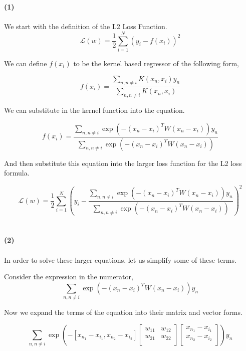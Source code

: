 \documentclass[submit]{harvardml}
\begin{document}
\begin{tcolorbox}[breakable]

\textbf{(1)}\\\\

We start with the definition of the L2 Loss Function.
$$\mathcal{L}(w) = \dfrac{1}{2}\sum\limits_{i = 1}^N (y_i - f(x_i))^2$$

We can define $f(x_i)$ to be the kernel based regressor of the following form,

\begin{equation*}
  f(x_i) = \frac{ \sum\limits_{n, n \neq i} K(x_n,x_i) y_n  }{ \sum\limits_{n, n \neq i} K(x_n,x_i) } 
\end{equation*}

We can substitute in the kernel function into the equation.

\begin{equation*}
  f(x_i) = \frac{ \sum\limits_{n, n \neq i} \exp(-(x_n-x_i)^T W (x_n-x_i) )
 y_n  }{ \sum\limits_{n, n \neq i} \exp(-(x_n-x_i)^T W (x_n-x_i) ) } 
\end{equation*}

And then substitute this equation into the larger loss function for the L2 loss formula. 


$$\boxed{\mathcal{L}(w) = \frac{1}{2}\sum\limits_{i = 1}^N \left( y_i - \frac{ \sum\limits_{n, n \neq i} \exp(-(x_n-x_i)^T W (x_n-x_i) )
 y_n  }{ \sum\limits_{n, n \neq i} \exp(-(x_n-x_i)^T W (x_n-x_i) ) } \right)^2}$$\\\\
 
 
\textbf{(2)}\\\\

In order to solve these larger equations, let us simplify some of these terms. 

Consider the expression in the numerator, 
$$\sum\limits_{n, n \neq i} \exp(-(x_n-x_i)^T W (x_n-x_i) )y_n$$

Now we expand the terms of the equation into their matrix and vector forms.

$$
\sum\limits_{n, n \neq i} \exp\left(-[x_{n_1} - x_{i_1}, x_{n_2} - x_{i_2}] 
\left[ {\begin{array}{cc}
   w_{11} & w_{12}\\
   w_{21} & w_{22}\\
\end{array} } \right] 
\left[ {\begin{array}{c}
   x_{n_1} - x_{i_1}\\
   x_{n_2} - x_{i_2}\\
\end{array} } \right] \right)y_n$$


\end{tcolorbox}
\end{document}
